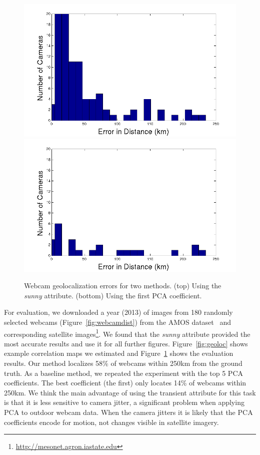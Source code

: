 \documentclass[10pt,twocolumn,letterpaper]{article}
\newcommand{\figref}[1]{Figure~\ref{fig:#1}}
\begin{document}
\begin{figure}[t]
  \centering
  \includegraphics[width=.9\linewidth, trim= 20mm 0mm 20mm 0mm]{figs/geoloc/tran_errors}
  \includegraphics[width=.9\linewidth, trim= 20mm 0mm 20mm 0mm]{figs/geoloc/pca_errors}
  \caption{Webcam geolocalization errors for two methods. (top)
    Using the \textit{sunny} attribute. (bottom)
    Using the first PCA coefficient.}
  \label{fig:locerror}
\end{figure}

For evaluation, we downloaded a year (2013) of images from 180
randomly selected webcams (\figref{webcamdist}) from the AMOS
dataset~\cite{jacobs07amos} and corresponding satellite
images\footnote{\url{http://mesonet.agron.iastate.edu}}.  We found
that the \textit{sunny} attribute provided the most accurate results
and use it for all further figures. \figref{geoloc} shows example 
correlation maps we estimated and \figref{locerror}
shows the evaluation results. Our method localizes 58\% of webcams
within 250km from the ground truth. As a baseline method, we repeated
the experiment with the top 5 PCA coefficients. The best coefficient
(the first) only locates 14\% of webcams within 250km. We think
the main advantage of using the transient attribute for this task is
that it is less sensitive to camera jitter, a significant problem when
applying PCA to outdoor webcam data. When the camera jitters it is
likely that the PCA coefficients encode for motion, not changes
visible in satellite imagery.
\end{document}
